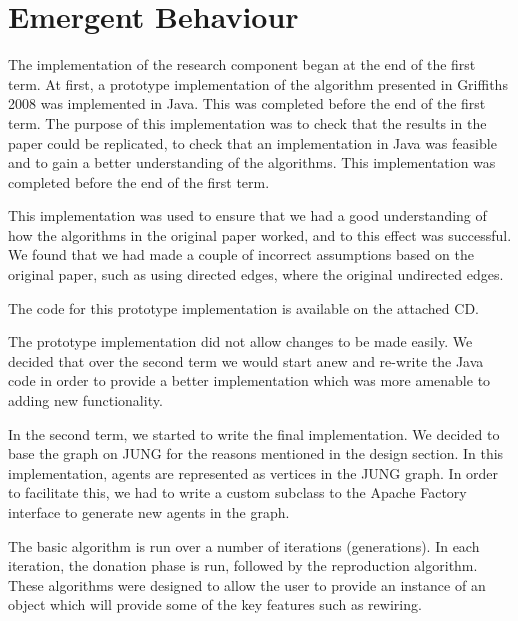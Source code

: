 \section{Emergent Behaviour}

The implementation of the research component began at the end of the first term. At first, a prototype implementation of the algorithm presented in Griffiths 2008 was implemented in Java. This was completed before the end of the first term. The purpose of this implementation was to check that the results in the paper could be replicated, to check that an implementation in Java was feasible and to gain a better understanding of the algorithms. This implementation was completed before the end of the first term.

This implementation was used to ensure that we had a good understanding of how the algorithms in the original paper worked, and to this effect was successful. We found that we had made a couple of incorrect assumptions based on the original paper, such as using directed edges, where the original undirected edges. 

The code for this prototype implementation is available on the attached CD.

The prototype implementation did not allow changes to be made easily. We decided that over the second term we would start anew and re-write the Java code in order to provide a better implementation which was more amenable to adding new functionality.

In the second term, we started to write the final implementation. We decided to base the graph on JUNG for the reasons mentioned in the design section. In this implementation, agents are represented as vertices in the JUNG graph. In order to facilitate this, we had to write a custom subclass to the Apache Factory interface to generate new agents in the graph.

The basic algorithm is run over a number of iterations (generations). In each iteration, the donation phase is run, followed by the reproduction algorithm. These algorithms were designed to allow the user to provide an instance of an object which will provide some of the key features such as rewiring.

